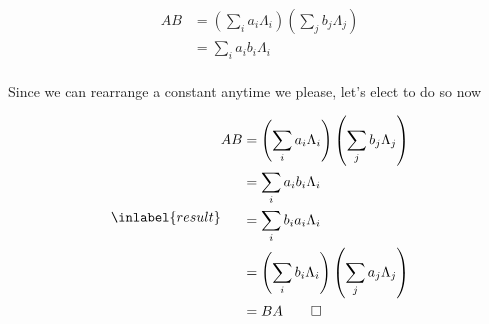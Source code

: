 \begin{answer}
  \begin{equation}
    \begin{split}
      AB
      &= \left(\sum_{i} a_i\Lambda_i\right)\left(\sum_{j} b_j\Lambda_j\right)\\
      &= \sum_{i} a_ib_i\Lambda_i\\
    \end{split}
  \end{equation}

  Since we can rearrange a constant anytime we please, let's elect to
  do so now

  \begin{equation}
    \inlabel{result}
    \begin{split}
      AB
      &= \left(\sum_{i} a_i\Lambda_i\right)\left(\sum_{j} b_j\Lambda_j\right)\\
      &= \sum_{i} a_ib_i\Lambda_i\\
      &= \sum_{i} b_ia_i\Lambda_i\\
      &= \left(\sum_{i} b_i\Lambda_i\right)\left(\sum_{j} a_j\Lambda_j\right)\\
      &= BA\qed
    \end{split}
  \end{equation}

\end{answer}
